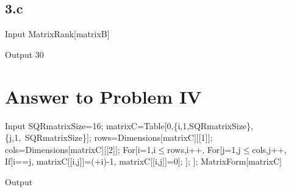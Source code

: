\documentclass[11pt,a4paper]{article}
\begin{document}
\subsection*{3.c}

\begin{mmaCell}[moredefined={matrixB}]{Input}
MatrixRank[matrixB]
\end{mmaCell}

\begin{mmaCell}{Output}
30
\end{mmaCell}

\clearpage
\section{Answer to Problem IV}\label{sec:P04}

\begin{mmaCell}[moredefined={SQRmatrixSize, matrixC, i, j, rows, cols}]{Input}
SQRmatrixSize=16;
matrixC=Table[0,\{i,1,SQRmatrixSize\},\{j,1,\
SQRmatrixSize\}];
rows=Dimensions[matrixC][[1]];
cols=Dimensions[matrixC][[2]];
For[i=1,i\(\pmb{\leq}\)rows,i++,
  For[j=1,j\(\pmb{\leq}\)cols,j++,
    If[i==j,
      matrixC[[i,j]]=(\mmaDef{\(\pmb{\pi}\)}+i)-1,
      matrixC[[i,j]]=0];
  ];
];
MatrixForm[matrixC]
\end{mmaCell}

\begin{mmaCell}[form=MatrixForm]{Output}

\end{mmaCell}
\end{document}
